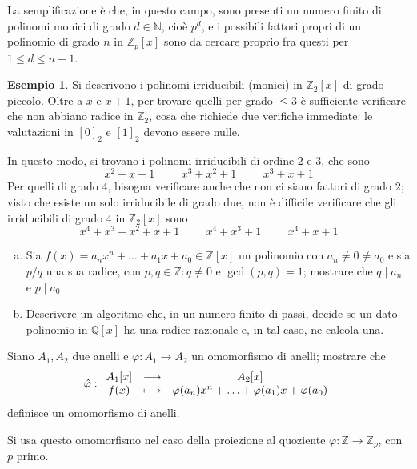 \documentclass[11pt, a4paper]{scrartcl}
\theoremstyle{definition}
\newtheorem{esempio}{Esempio}
\numberwithin{esempio}{section}
\theoremstyle{definition}
\numberwithin{obs}{section}
\numberwithin{nota}{section}
\numberwithin{equation}{subsection}
\begin{document}
La semplificazione \`e che, in questo campo, sono presenti un numero finito di polinomi monici di grado $d \in \mathbb{N}$, cio\`e $p^d$, e i possibili fattori propri di un polinomio di grado $n$ in $\mathbb{Z}_p[x]$ sono da cercare proprio fra questi per $1 \le d \le n-1$.
\begin{esempio}
	Si descrivono i polinomi irriducibili (monici) in $\mathbb{Z}_2[x]$ di grado piccolo. 
	Oltre a $x$ e $x+1$, per trovare quelli per grado $\le 3$ \`e sufficiente verificare che non abbiano radice in $\mathbb{Z}_2$, cosa che richiede due verifiche immediate: le valutazioni in $[0]_2$ e $[1]_2$ devono essere nulle.

	In questo modo, si trovano i polinomi irriducibili di ordine $2$ e $3$, che sono 
	\[
	x^2 + x + 1 \hspace{1cm} x^3 + x^2 + 1 \hspace{1cm} x^3 + x +1
	\] 
	Per quelli di grado $4$, bisogna verificare anche che non ci siano fattori di grado $2$; visto che esiste un solo irriducibile di grado due, non \`e difficile verificare che gli irriducibili di grado $4$ in $\mathbb{Z}_2 [x]$ sono
	\[
	x^4 + x^3 + x^2 + x +1 \hspace{1cm}x^4 + x^3 +1 \hspace{1cm}x^4 + x + 1
	\] 
\end{esempio}
\begin{enumerate}[(a).]
	\item Sia $f(x) = a_n x^n + \ldots + a_1 x + a_0 \in \mathbb{Z}[x]$ un polinomio con $a_n \neq 0 \neq a_0$ e sia $ p /q$ una sua radice, con $p,q \in \mathbb{Z}:q \neq 0$ e $\operatorname{gcd}(p,q) =1$; mostrare che $q  \mid a_n$ e $p  \mid a_0$.
	\item Descrivere un algoritmo che, in un numero finito di passi, decide se un dato polinomio in $\mathbb{Q}[x]$ ha una radice razionale e, in tal caso, ne calcola una.
\end{enumerate}
\begin{prop}
	{}{}
	Siano $A_1, A_2$ due anelli e $\varphi : A_1 \to A_2$ un omomorfismo di anelli; mostrare che 
	\[
	\hat{\varphi } : 
	\begin{array}{c c c}
		A_1[x] & \longrightarrow & A_2[x]\\
		f(x)  & \longmapsto & \varphi (a_n) x^n + \ldots + \varphi (a_1) x + \varphi (a_0) 	\end{array}
	\] 
	definisce un omomorfismo di anelli.
\end{prop}
\noindent Si usa questo omomorfismo nel caso della proiezione al quoziente $\varphi :\mathbb{Z} \to \mathbb{Z}_p$, con $p$ primo.
\end{document}
